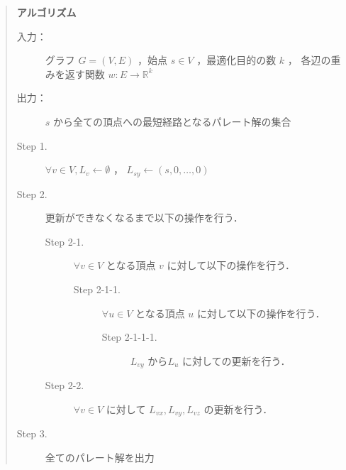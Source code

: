 \documentclass[12pt]{optlab-bachelor}
\begin{document}
\begin{quote}
  \textbf{アルゴリズム}
  \begin{description}
    \item[入力：] グラフ $G=(V,E)$ ，始点 $s \in V$ ，最適化目的の数 $k$ ，
    各辺の重みを返す関数 $w : E \to \mathbb{R}^k$
    \item[出力：] $s$ から全ての頂点への最短経路となるパレート解の集合
    \item[Step 1.] $\forall v \in V , L_v \leftarrow \emptyset$ ，
    $L_{sy} \leftarrow (s,0,\ldots,0)$
    \item[Step 2.] 更新ができなくなるまで以下の操作を行う．
    \begin{description}
      \item[Step 2-1.] $\forall v \in V$ となる頂点 $v$ に対して以下の操作を行う．
      \begin{description}
        \item[Step 2-1-1.] $\forall u \in V$ となる頂点 $u$ に対して以下の操作を行う．
        \begin{description}
          \item[Step 2-1-1-1.] $L_{vy}$ から$ L_u$ に対しての更新を行う．
        \end{description}
      \end{description}
      \item[Step 2-2.] $\forall v \in V$ に対して
      $L_{vx},L_{vy},L_{vz}$ の更新を行う．
    \end{description}
    \item[Step 3.] 全てのパレート解を出力
  \end{description}
\end{quote}
\end{document}

